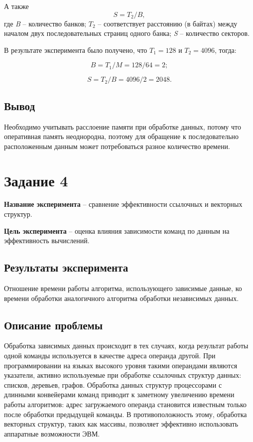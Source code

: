 А также
\begin{equation}
	S = T_2 / B,
\end{equation}
где \textit{B} -- количество банков; $T_2$ -- соответствует расстоянию (в
байтах) между началом двух последовательных страниц одного банка; \textit{S} --
количество секторов.

В результате эксперимента было получено, что $T_1 = 128$ и $T_2 = 4096$, тогда:

\begin{equation}
	B = T_1 / M = 128 / 64 = 2;
\end{equation}

\begin{equation}
	S = T_2 / B = 4096 / 2 = 2048.
\end{equation}


\subsection{Вывод}

Необходимо учитывать расслоение памяти при обработке данных, потому что
оперативная память неоднородна, поэтому для обращение к последовательно
расположенным данным может потребоваться разное количество времени.

\section{Задание 4}

\textbf{Название эксперимента} -- сравнение эффективности ссылочных и векторных
структур.

\textbf{Цель эксперимента} -- оценка влияния зависимости команд по данным на
эффективность вычислений.

\subsection{Результаты эксперимента}
Отношение времени работы алгоритма, использующего зависимые данные, ко времени
обработки аналогичного алгоритма обработки независимых данных.

\subsection{Описание проблемы}
Обработка зависимых данных происходит в тех случаях, когда результат работы
одной команды используется в качестве адреса операнда другой. При
программировании на языках высокого уровня такими операндами являются
указатели, активно используемые при обработке ссылочных структур данных:
списков, деревьев, графов. Обработка данных структур процессорами с длинными
конвейерами команд приводит к заметному увеличению  времени работы алгоритмов:
адрес загружаемого операнда становится известным только после обработки
предыдущей команды. В противоположность этому, обработка векторных структур,
таких как массивы, позволяет эффективно использовать аппаратные возможности
ЭВМ.

